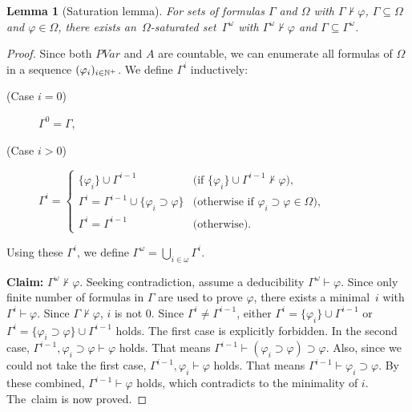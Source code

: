 \documentclass[doctor]{iscs-thesis}
\newtheorem{lemma}{Lemma}
\begin{document}
\begin{lemma}[Saturation lemma]
\label{lemma:saturation}
 For sets of formulas $\Gamma$ and $\Omega$ with $\Gamma\not\vdash\varphi$, 
 $\Gamma\subseteq \Omega$ and $\varphi \in \Omega$,
there exists an~$\Omega$-saturated
 set~$\Gamma^\omega$ with $\Gamma^\omega\not\vdash\varphi$
 and $\Gamma\subseteq \Gamma^\omega$.
\end{lemma}
\begin{proof}
 Since both $PVar$ and $A$ are countable, we can enumerate all formulas
 of $\Omega$ in a sequence
 $(\varphi_i)_{i\in{\mathbb N}^{+}}$.
 We define $\Gamma^i$ inductively:
\begin{description}
 \item[(Case $i = 0$)] $\Gamma^0 = \Gamma$,
 \item[(Case $i > 0$)] $\Gamma^i =
\begin{cases}
\{\varphi_{i}\}\cup \Gamma^{i-1} & \text{(if
 $\{\varphi_{i}\}\cup\Gamma^{i-1}\not\vdash\varphi$)}, \\
\Gamma^i = \Gamma^{i-1} \cup\{\varphi_{i}\supset\varphi\} &\text{(otherwise if
 $\varphi_i\supset \varphi\in \Omega)$},\\
 \Gamma^i = \Gamma^{i-1} &\text{(otherwise)}.
\end{cases}$
\end{description}
Using these $\Gamma^i$\kern -1pt, we define $\Gamma^\omega = \bigcup_{i\in\omega}
 \Gamma^i$\kern -1pt.

\noindent
\textbf{Claim:} 
 $\Gamma^\omega \not\vdash \varphi$.
Seeking contradiction, assume a deducibility $\Gamma^\omega\vdash\varphi$. 
Since only finite number of formulas in $\Gamma$ are used to prove $\varphi$,
there exists 
 a minimal~$i$ with
 $\Gamma^i\vdash\varphi$. Since $\Gamma\not\vdash\varphi$, $i$ is not 0.
 Since $\Gamma^i\neq \Gamma^{i-1}$, 
 either $\Gamma^i = \{\varphi_{i}\} \cup \Gamma^{i-1}$ 
or $\Gamma^i = \{\varphi_{i}\supset\varphi\}\cup \Gamma^{i-1}$ holds.
 The first case is explicitly forbidden.
 In the second case, $\Gamma^{i-1},\varphi_{i}\supset\varphi\vdash \varphi$ holds.
 That means $\Gamma^{i-1}\vdash (\varphi_{i}\supset\varphi)\supset \varphi$.
 Also, since we could not take the first case, $\Gamma^{i-1},\varphi_{i}\vdash \varphi$
 holds. That means $\Gamma^{i-1}\vdash \varphi_{i}\supset\varphi$.
 By these combined, $\Gamma^{i-1}\vdash\varphi$ holds, which contradicts to the minimality of
 $i$. The~claim is now proved.
\end{proof}
\end{document}
